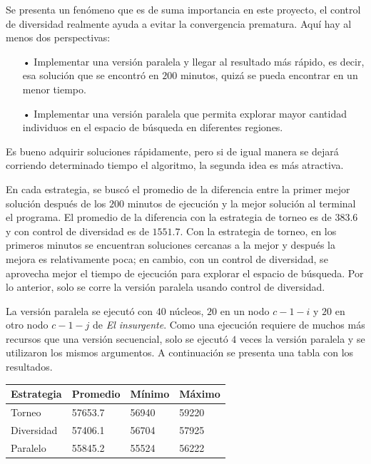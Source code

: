 \documentclass[10pt,a4paper]{article}
\begin{document}
\noindent Se presenta un fenómeno que es de suma importancia en este proyecto, el control de diversidad realmente ayuda a evitar la convergencia prematura. Aquí hay al menos dos perspectivas:

\begin{enumerate}
\item[•] Implementar una versión paralela y llegar al resultado más rápido, es decir, esa solución que se encontró en $200$ minutos, quizá se pueda encontrar en un menor tiempo.
\item[•] Implementar una versión paralela que permita explorar mayor cantidad individuos en el espacio de búsqueda en diferentes regiones.
\end{enumerate}

\noindent Es bueno adquirir soluciones rápidamente, pero si de igual manera se dejará corriendo determinado tiempo el algoritmo, la segunda idea es más atractiva.

\noindent En cada estrategia, se buscó el promedio de la diferencia entre la primer mejor solución después de los $200$ minutos de ejecución y la mejor solución al terminal el programa. El promedio de la diferencia con la estrategia de torneo es de $383{.}6$ y con control de diversidad es de $1551{.}7$. Con la estrategia de torneo, en los primeros minutos se encuentran soluciones cercanas a la mejor y después la mejora es relativamente poca; en cambio, con un control de diversidad, se aprovecha mejor el tiempo de ejecución para explorar el espacio de búsqueda. Por lo anterior, solo se corre la versión paralela usando control de diversidad.

\noindent La versión paralela se ejecutó con $40$ núcleos, $20$ en un nodo $c-1-i$ y $20$ en otro nodo $c-1-j$ de \textit{El insurgente}. Como una ejecución requiere de muchos más recursos que una versión secuencial, solo se ejecutó $4$ veces la versión paralela y se utilizaron los mismos argumentos. A continuación se presenta una tabla con los resultados.

\begin{table}[H]
\centering
\begin{tabular}{|l|l|l|l|}
\hline
Estrategia & Promedio & Mínimo & Máximo \\
\hline
Torneo & 57653.7 & 56940 & 59220 \\ 
Diversidad & 57406.1 & 56704 & 57925 \\
Paralelo & 55845.2 & 55524 & 56222 \\
\hline
\end{tabular}
\end{table}
\end{document}
